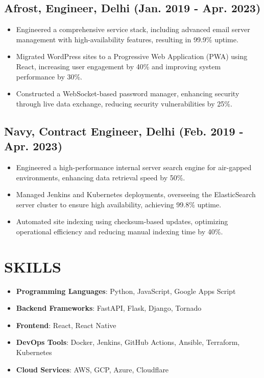 \documentclass[a4paper,9pt]{article}
\begin{document}
\subsection*{Afrost, Engineer, Delhi (Jan. 2019 - Apr. 2023)}
\begin{itemize}
    \item Engineered a comprehensive service stack, including advanced email server management with high-availability features, resulting in 99.9\% uptime.
    \item Migrated WordPress sites to a Progressive Web Application (PWA) using React, increasing user engagement by 40\% and improving system performance by 30\%.
    \item Constructed a WebSocket-based password manager, enhancing security through live data exchange, reducing security vulnerabilities by 25\%.
\end{itemize}

\subsection*{Navy, Contract Engineer, Delhi (Feb. 2019 - Apr. 2023)}
\begin{itemize}
    \item Engineered a high-performance internal server search engine for air-gapped environments, enhancing data retrieval speed by 50\%.
    \item Managed Jenkins and Kubernetes deployments, overseeing the ElasticSearch server cluster to ensure high availability, achieving 99.8\% uptime.
    \item Automated site indexing using checksum-based updates, optimizing operational efficiency and reducing manual indexing time by 40\%.
\end{itemize}

\section*{SKILLS}

\begin{multicols}{2}
\begin{itemize}[leftmargin=*]
    \item \textbf{Programming Languages}: Python, JavaScript, Google Apps Script
    \item \textbf{Backend Frameworks}: FastAPI, Flask, Django, Tornado
    \item \textbf{Frontend}: React, React Native
    \item \textbf{DevOps Tools}: Docker, Jenkins, GitHub Actions, Ansible, Terraform, Kubernetes
    \item \textbf{Cloud Services}: AWS, GCP, Azure, Cloudflare
\end{itemize}
\end{multicols}
\end{document}
